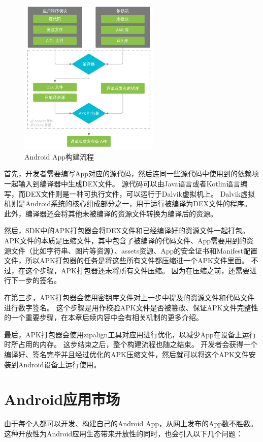 \begin{figure}[htbp]
	\centering
	\includegraphics[width=0.6\textwidth]{./Figures/edwin-build-process-CHN.png}
	\caption{Android App构建流程}
	\label{fig:Android-Build-Process}
\end{figure}

首先，开发者需要编写App对应的源代码，然后连同一些源代码中使用到的依赖项一起输入到编译器中生成DEX文件。
源代码可以由Java语言或者Kotlin语言编写，而DEX文件则是一种可执行文件，可以运行于Dalvik虚拟机上。
Dalvik虚拟机则是Android系统的核心组成部分之一，用于运行被编译为DEX文件的程序。
此外，编译器还会将其他未被编译的资源文件转换为编译后的资源。

然后，SDK中的APK打包器会将DEX文件和已经编译好的资源文件一起打包。
APK文件的本质是压缩文件，其中包含了被编译的代码文件、App需要用到的资源文件（比如字符串、图片等资源）、assets资源、App的安全证书和Manifest配置文件，所以APK打包器的任务是将这些所有文件都压缩进一个APK文件里面。
不过，在这个步骤，APK打包器还未将所有文件压缩。
因为在压缩之前，还需要进行下一步的签名。

在第三步，APK打包器会使用密钥库文件对上一步中提及的资源文件和代码文件进行数字签名。
这个步骤是用作校验APK文件是否被篡改、保证APK文件完整性的一个重要步骤，在本章后续内容中会有相关机制的更多介绍。

最后，APK打包器会使用zipalign工具对应用进行优化，以减少App在设备上运行时所占用的内存。
这步结束之后，整个构建流程也随之结束。
开发者会获得一个编译好、签名完毕并且经过优化的APK压缩文件，然后就可以将这个APK文件安装到Android设备上运行使用。


\section{Android应用市场}
由于每个人都可以开发、构建自己的Android App，从网上发布的App数不胜数。这种开放性为Android应用生态带来开放性的同时，也会引入以下几个问题：

